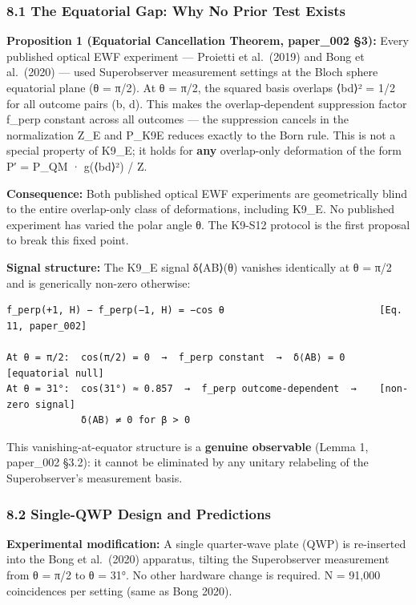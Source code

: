 \documentclass[
  11pt,
]{article}
\begin{document}
\subsubsection{8.1 The Equatorial Gap: Why No Prior Test
Exists}\label{the-equatorial-gap-why-no-prior-test-exists}

\textbf{Proposition 1 (Equatorial Cancellation Theorem, paper\_002 §3):}
Every published optical EWF experiment --- Proietti et al.~(2019) and
Bong et al.~(2020) --- used Superobserver measurement settings at the
Bloch sphere equatorial plane (θ = π/2). At θ = π/2, the squared basis
overlaps \textbar⟨b\textbar d⟩\textbar² = 1/2 for all outcome pairs (b,
d). This makes the overlap-dependent suppression factor f\_perp constant
across all outcomes --- the suppression cancels in the normalization
Z\_E and P\_K9E reduces exactly to the Born rule. This is not a special
property of K9\_E; it holds for \textbf{any} overlap-only deformation of
the form P′ = P\_QM · g(\textbar⟨b\textbar d⟩\textbar²) / Z.

\textbf{Consequence:} Both published optical EWF experiments are
geometrically blind to the entire overlap-only class of deformations,
including K9\_E. No published experiment has varied the polar angle θ.
The K9-S12 protocol is the first proposal to break this fixed point.

\textbf{Signal structure:} The K9\_E signal δ⟨AB⟩(θ) vanishes
identically at θ = π/2 and is generically non-zero otherwise:

\begin{verbatim}
f_perp(+1, H) − f_perp(−1, H) = −cos θ                           [Eq. 11, paper_002]

At θ = π/2:  cos(π/2) = 0  →  f_perp constant  →  δ⟨AB⟩ = 0     [equatorial null]
At θ = 31°:  cos(31°) ≈ 0.857  →  f_perp outcome-dependent  →    [non-zero signal]
             δ⟨AB⟩ ≠ 0 for β > 0
\end{verbatim}

This vanishing-at-equator structure is a \textbf{genuine observable}
(Lemma 1, paper\_002 §3.2): it cannot be eliminated by any unitary
relabeling of the Superobserver's measurement basis.

\subsubsection{8.2 Single-QWP Design and
Predictions}\label{single-qwp-design-and-predictions}

\textbf{Experimental modification:} A single quarter-wave plate (QWP) is
re-inserted into the Bong et al.~(2020) apparatus, tilting the
Superobserver measurement from θ = π/2 to θ = 31°. No other hardware
change is required. N = 91,000 coincidences per setting (same as Bong
2020).
\end{document}
